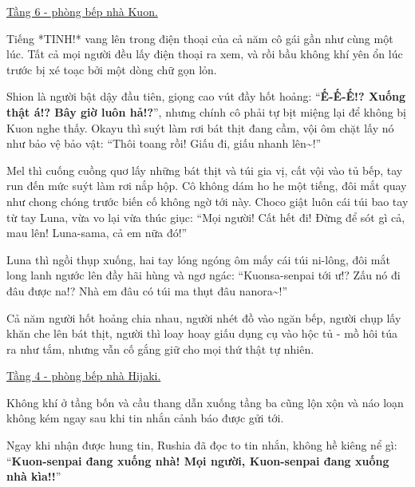 \documentclass[../main.tex]{subfiles}
\begin{document}
\begin{center}
    \uline{Tầng 6 - phòng bếp nhà Kuon.}
\end{center}

Tiếng *TINH!* vang lên trong điện thoại của cả năm cô gái gần như cùng một lúc. Tất cả mọi người đều lấy điện thoại ra xem, và rồi bầu không khí yên ổn lúc trước bị xé toạc bởi một dòng chữ gọn lỏn.

Shion là người bật dậy đầu tiên, giọng cao vút đầy hốt hoảng: ``\textbf{Ế-Ế-Ế!? Xuống thật á!? Bây giờ luôn hả!?}'', nhưng chính cô phải tự bịt miệng lại để không bị Kuon nghe thấy. Okayu thì suýt làm rơi bát thịt đang cầm, vội ôm chặt lấy nó như bảo vệ bảo vật: ``Thôi toang rồi! Giấu đi, giấu nhanh lên\~{}!''

Mel thì cuống cuồng quơ lấy những bát thịt và túi gia vị, cất vội vào tủ bếp, tay run đến mức suýt làm rơi nắp hộp. Cô không dám ho he một tiếng, đôi mắt quay như chong chóng trước biến cố không ngờ tới này. Choco giật luôn cái túi bao tay từ tay Luna, vừa vo lại vừa thúc giục: ``Mọi người! Cất hết đi! Đừng để sót gì cả, mau lên! Luna-sama, cả em nữa đó!''

Luna thì ngồi thụp xuống, hai tay lóng ngóng ôm mấy cái túi ni-lông, đôi mắt long lanh ngước lên đầy hãi hùng và ngơ ngác: ``Kuonsa-senpai tới ư!? Zấu nó đi đâu được na!? Nhà em đâu có túi ma thụt đâu nanora\~{}!''

Cả năm người hốt hoảng chia nhau, người nhét đồ vào ngăn bếp, người chụp lấy khăn che lên bát thịt, người thì loay hoay giấu dụng cụ vào hộc tủ - mồ hôi túa ra như tắm, nhưng vẫn cố gắng giữ cho mọi thứ thật tự nhiên.

\begin{center}
    \uline{Tầng 4 - phòng bếp nhà Hijaki.}
\end{center}


Không khí ở tầng bốn và cầu thang dẫn xuống tầng ba cũng lộn xộn và náo loạn không kém ngay sau khi tin nhắn cảnh báo được gửi tới.

Ngay khi nhận được hung tin, Rushia đã đọc to tin nhắn, không hề kiêng nể gì: ``\textbf{Kuon-senpai đang xuống nhà! Mọi người, Kuon-senpai đang xuống nhà kìa!!}''
\end{document}
